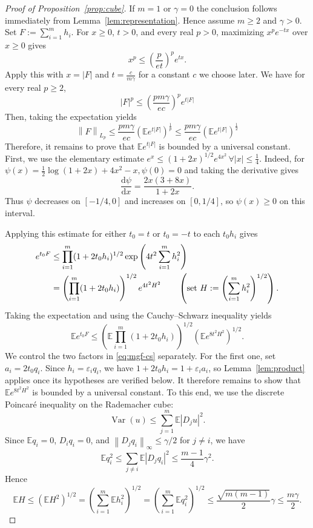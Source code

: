 \documentclass[11pt]{article}
\newcommand{\E}{\mathbb{E}}
\newcommand{\norm}[1]{\left\lVert #1\right\rVert}
\newcommand{\abs}[1]{\left\lvert #1\right\rvert}
\begin{document}
\begin{proof}[Proof of Proposition~\ref{prop:cube}] 
If $m = 1$ or $\gamma = 0$ the conclusion follows immediately from Lemma~\ref{lem:representation}. Hence assume $m \ge 2$ and $\gamma > 0$. 
Set $F := \sum_{i = 1}^m h_i$. For $x\geq0$, $t>0$, and every real $p>0$, maximizing $x^pe^{-tx}$ over $x\geq0$ gives 
\[ x^p\leq\left(\frac{p}{et}\right)^p e^{tx}.\]
Apply this with $x=\abs{F}$ and $t = \frac{c}{m\gamma}$ for a constant $c$ we choose later. We have for every real $p\geq2$, 
\[ \abs{F}^p \le \left(\frac{pm\gamma}{ec}\right)^p e^{t\abs{F}} \]
Then, taking the expectation yields
\[
  \norm{F}_{L_p} \leq \frac{pm\gamma}{ec} \left( \E e^{t\abs{F}} \right)^{\frac{1}{p}} \le \frac{pm\gamma}{ec} \left( \E e^{t\abs{F}} \right)^{\frac{1}{2}}
\]
Therefore, it remains to prove that $\E e^{t\abs{F}}$ is bounded by a universal constant. First, we use the elementary estimate $e^x \le (1+2x)^{1/2}e^{4x^2}\, \forall \abs x\le\frac14.$ Indeed, for $\psi(x) = \frac12\log(1+2x)+4x^2-x, \psi(0) =  0$ and taking the derivative gives 
\[
\frac{\mathrm{d}\psi}{\mathrm{d}x} = \frac{2x(3+8x)}{1+2x}. 
\]
Thus $\psi$ decreases on $[-1/4,0]$ and increases on $[0,1/4]$, so $\psi(x)\ge0$ on this interval. 

Applying this estimate for either $t_0 = t$ or $t_0=-t$ to each $t_0h_i$ gives
\begin{align} \label{eq:mgf-pointwise}
e^{t_0F} &\le \prod_{i=1}^m(1+2t_0h_i)^{1/2} \exp\left(4t^2\sum_{i=1}^mh_i^2 \right) \\
& =
\left(\prod_{i=1}^m(1+2t_0h_i)\right)^{1/2} e^{4t^2H^2} \qquad \left(\text{set } H := \left(\sum_{i = 1}^m h_i^2 \right)^{1/2} \right) \notag.
\end{align}
Taking the expectation and using the Cauchy--Schwarz inequality yields 
\begin{equation}\label{eq:mgf-cs}
\E e^{t_0F} \le \left( \E\prod_{i=1}^m(1+2t_0h_i)\right)^{1/2} \left(\E e^{8t^2H^2}\right)^{1/2}.
\end{equation}
We control the two factors in \eqref{eq:mgf-cs} separately. For the first one, set $a_i=2t_0q_i$. Since $h_i=\varepsilon_iq_i$, we have $1+2t_0h_i=1+\varepsilon_i a_i$, so Lemma~\ref{lem:product} applies once its hypotheses are verified below. It therefore remains to show that $\E e^{8t^2H^2}$ is bounded by a universal constant. 
To this end, we use the discrete Poincar\'e inequality on the Rademacher cube:
\[
\operatorname{Var}(u) \le \sum_{j=1}^m \E\abs{D_ju}^2.
\]
Since $\E q_i=0$, $D_iq_i=0$, and $\norm{D_jq_i}_\infty\le\gamma/2$ for $j\neq i$, we have 
\[
\E q_i^2 \le \sum_{j\neq i} \E\abs{D_jq_i}^2 \le \frac{m-1}{4}\gamma^2.
\]
Hence
\begin{equation} \label{eq:EH}
\E H \le (\E H^2)^{1/2} = \left(\sum_{i=1}^m\E h_i^2\right)^{1/2} =  \left(\sum_{i=1}^m\E q_i^2\right)^{1/2} \le \frac{\sqrt{m(m-1)}}{2}\gamma \le \frac{m\gamma}{2}.
\end{equation} 


\end{proof}
\end{document}
